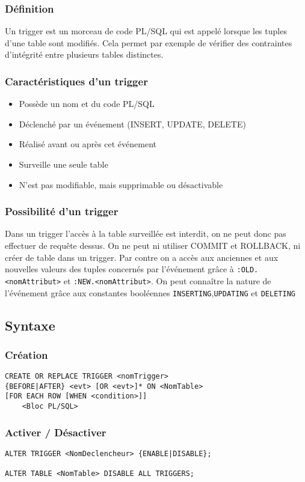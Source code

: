 \documentclass[10pt,a4paper,twoside]{article}
\begin{document}
\subsubsection{Définition} 
Un trigger est un morceau de code PL/SQL qui est appelé lorsque les tuples d'une table sont modifiés.  Cela permet par exemple de vérifier des contraintes d'intégrité entre plusieurs tables distinctes.

\subsubsection{Caractéristiques d'un trigger}
\begin{itemize}
\item Possède un nom et du code PL/SQL
\item Déclenché par un événement (INSERT, UPDATE, DELETE)
\item Réalisé avant ou après cet événement
\item Surveille une seule table
\item N'est pas modifiable, mais supprimable ou désactivable
\end{itemize}

\subsubsection{Possibilité d'un trigger} 
Dans un trigger l'accès à la table surveillée est interdit, on ne peut donc pas effectuer de requête dessus. On ne peut ni utiliser COMMIT et ROLLBACK, ni créer de table dans un trigger. Par contre on a accès aux anciennes et aux nouvelles valeurs des tuples concernés par l'événement grâce à \verb=:OLD.<nomAttribut>= et \verb=:NEW.<nomAttribut>=. On peut connaître la nature de l'événement grâce aux constantes booléennes \verb=INSERTING=,\verb=UPDATING= et \verb=DELETING=

\subsection{Syntaxe}
\subsubsection{Création}
\begin{verbatim}
CREATE OR REPLACE TRIGGER <nomTrigger>
{BEFORE|AFTER} <evt> [OR <evt>]* ON <NomTable>
[FOR EACH ROW [WHEN <condition>]]
    <Bloc PL/SQL>
\end{verbatim}

\subsubsection{Activer / Désactiver}
\begin{verbatim}
ALTER TRIGGER <NomDeclencheur> {ENABLE|DISABLE};

ALTER TABLE <NomTable> DISABLE ALL TRIGGERS;
\end{verbatim}
\end{document}

